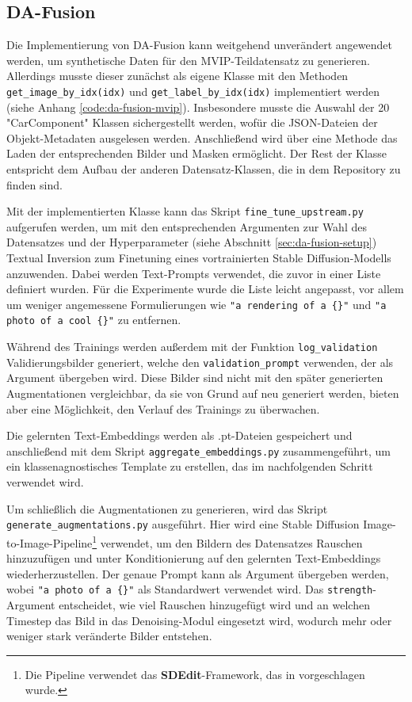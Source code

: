 \subsection{DA-Fusion} \label{sec:da-fusion-implementation}

Die Implementierung von DA-Fusion kann weitgehend unverändert angewendet werden, um synthetische Daten für den MVIP-Teildatensatz zu generieren. Allerdings musste dieser zunächst als eigene Klasse mit den Methoden \lstinline{get_image_by_idx(idx)} und \lstinline{get_label_by_idx(idx)} implementiert werden (siehe Anhang \ref{code:da-fusion-mvip}). Insbesondere musste die Auswahl der 20 "CarComponent" Klassen sichergestellt werden, wofür die JSON-Dateien der Objekt-Metadaten ausgelesen werden. Anschließend wird über eine Methode das Laden der entsprechenden Bilder und Masken ermöglicht. Der Rest der Klasse entspricht dem Aufbau der anderen Datensatz-Klassen, die in dem Repository zu finden sind.

Mit der implementierten Klasse kann das Skript \lstinline{fine_tune_upstream.py} aufgerufen werden, um mit den entsprechenden Argumenten zur Wahl des Datensatzes und der Hyperparameter (siehe Abschnitt \ref{sec:da-fusion-setup}) Textual Inversion zum Finetuning eines vortrainierten Stable Diffusion-Modells anzuwenden. Dabei werden Text-Prompts verwendet, die zuvor in einer Liste definiert wurden. Für die Experimente wurde die Liste leicht angepasst, vor allem um weniger angemessene Formulierungen wie \lstinline|"a rendering of a {}"| und \lstinline|"a photo of a cool {}"| zu entfernen.

Während des Trainings werden außerdem mit der Funktion \lstinline{log_validation} Validierungsbilder generiert, welche den \lstinline{validation_prompt} verwenden, der als Argument übergeben wird. Diese Bilder sind nicht mit den später generierten Augmentationen vergleichbar, da sie von Grund auf neu generiert werden, bieten aber eine Möglichkeit, den Verlauf des Trainings zu überwachen.

Die gelernten Text-Embeddings werden als .pt-Dateien gespeichert und anschließend mit dem Skript \lstinline{aggregate_embeddings.py} zusammengeführt, um ein klassenagnostisches Template zu erstellen, das im nachfolgenden Schritt verwendet wird.

Um schließlich die Augmentationen zu generieren, wird das Skript \lstinline{generate_augmentations.py} ausgeführt. Hier wird eine Stable Diffusion Image-to-Image-Pipeline\footnote{Die Pipeline verwendet das \textbf{SDEdit}-Framework, das in \parencite{Meng2022sdedit} vorgeschlagen wurde.} verwendet, um den Bildern des Datensatzes Rauschen hinzuzufügen und unter Konditionierung auf den gelernten Text-Embeddings wiederherzustellen. Der genaue Prompt kann als Argument übergeben werden, wobei \lstinline|"a photo of a {}"| als Standardwert verwendet wird. Das \lstinline{strength}-Argument entscheidet, wie viel Rauschen hinzugefügt wird und an welchen Timestep das Bild in das Denoising-Modul eingesetzt wird, wodurch mehr oder weniger stark veränderte Bilder entstehen.

